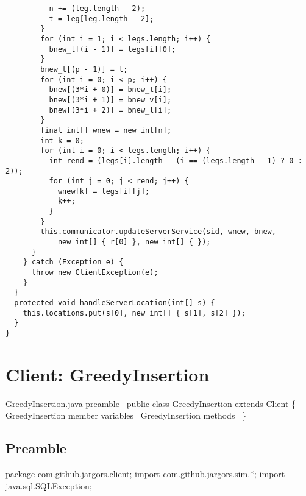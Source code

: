 {\begin{verbatim}
          n += (leg.length - 2);
          t = leg[leg.length - 2];
        }
        for (int i = 1; i < legs.length; i++) {
          bnew_t[(i - 1)] = legs[i][0];
        }
        bnew_t[(p - 1)] = t;
        for (int i = 0; i < p; i++) {
          bnew[(3*i + 0)] = bnew_t[i];
          bnew[(3*i + 1)] = bnew_v[i];
          bnew[(3*i + 2)] = bnew_l[i];
        }
        final int[] wnew = new int[n];
        int k = 0;
        for (int i = 0; i < legs.length; i++) {
          int rend = (legs[i].length - (i == (legs.length - 1) ? 0 : 2));
          for (int j = 0; j < rend; j++) {
            wnew[k] = legs[i][j];
            k++;
          }
        }
        this.communicator.updateServerService(sid, wnew, bnew,
            new int[] { r[0] }, new int[] { });
      }
    } catch (Exception e) {
      throw new ClientException(e);
    }
  }
  protected void handleServerLocation(int[] s) {
    this.locations.put(s[0], new int[] { s[1], s[2] });
  }
}
\end{verbatim}
}

\nwenddocs{}\chapter{Client: GreedyInsertion}
\label{client-greedy}

\nwenddocs{}\endmoddef\nwstartdeflinemarkup\nwenddeflinemarkup
\LA{}GreedyInsertion.java preamble~{\nwtagstyle{}}\RA{}
public class GreedyInsertion extends Client \{
  \LA{}\code{}GreedyInsertion\edoc{} member variables~{\nwtagstyle{}}\RA{}
  \LA{}\code{}GreedyInsertion\edoc{} methods~{\nwtagstyle{}}\RA{}
\}
\nwendcode{}\nwdocspar

\section{Preamble}
\nwenddocs{}\endmoddef\nwstartdeflinemarkup{}\nwenddeflinemarkup
package com.github.jargors.client;
import com.github.jargors.sim.*;
import java.sql.SQLException;
\nwendcode{}\nwdocspar

